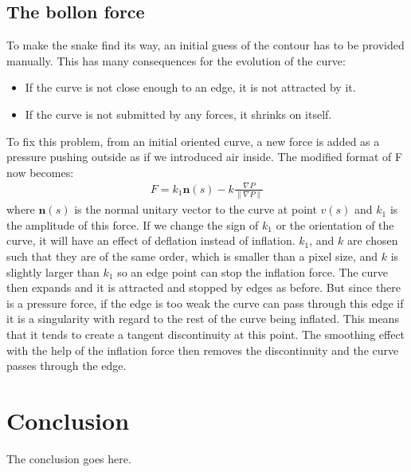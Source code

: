 \documentclass[journal]{IEEEtran}
\begin{document}
\subsection{The bollon force}
To make the snake find its way, an initial guess of the contour has to be provided manually. This has many consequences for the evolution of the curve:
\begin{itemize}
  \item If the curve is not close enough to an edge, it is not attracted by it.
  \item If the curve is not submitted by any forces, it shrinks on itself.
\end{itemize}
To fix this problem, from an initial oriented curve, a new force is added as a pressure pushing outside as if we introduced air inside. The modified format of F now becomes:
\begin{equation}\begin{aligned}
F=k_1\mathbf{n}(s)-k\frac{\nabla P}{\|\nabla P\|}
\end{aligned}\end{equation}
where $\mathbf{n}(s)$ is the normal unitary vector to the curve at point $v(s)$ and $k_1$ is the amplitude of this force. If we
change the sign of $k_1$ or the orientation of the curve, it will
have an effect of deflation instead of inflation. $k_1$, and $k$ are chosen such that they are of the same order, which is
smaller than a pixel size, and $k$ is slightly larger than $k_1$ so an edge point can stop the inflation force. The curve then
expands and it is attracted and stopped by edges as before. But since there is a pressure force, if the edge is too
weak the curve can pass through this edge if it is a singularity with regard to the rest of the curve being inflated.
This means that it tends to create a tangent discontinuity
at this point. The smoothing effect with the help of the
inflation force then removes the discontinuity and the
curve passes through the edge.
\section{Conclusion}
The conclusion goes here.\cite{han2020survey}

\ifCLASSOPTIONcaptionsoff
  \newpage
\fi



\end{document}
